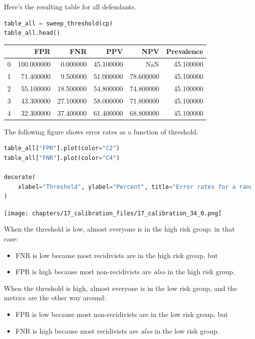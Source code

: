 Here's the resulting table for all defendants.

\begin{lstlisting}[language=Python,style=source]
table_all = sweep_threshold(cp)
table_all.head()
\end{lstlisting}

\begin{tabular}{lrrrrr}
\midrule
 & FPR & FNR & PPV & NPV & Prevalence \\
\midrule
0 & 100.000000 & 0.000000 & 45.100000 & NaN & 45.100000 \\
1 & 71.400000 & 9.500000 & 51.000000 & 78.600000 & 45.100000 \\
2 & 55.100000 & 18.500000 & 54.800000 & 74.800000 & 45.100000 \\
3 & 43.300000 & 27.100000 & 58.000000 & 71.800000 & 45.100000 \\
4 & 32.300000 & 37.400000 & 61.400000 & 68.800000 & 45.100000 \\
\midrule
\end{tabular}

The following figure shows error rates as a function of threshold.

\begin{lstlisting}[language=Python,style=source]
table_all["FPR"].plot(color="C2")
table_all["FNR"].plot(color="C4")

decorate(
    xlabel="Threshold", ylabel="Percent", title="Error rates for a range of thresholds"
)
\end{lstlisting}

\begin{center}
\texttt{[image: chapters/17\_calibration\_files/17\_calibration\_34\_0.png]}
\end{center}

When the threshold is low, almost everyone is in the high risk group; in
that case:

\begin{itemize}
\item
  FNR is low because most recidivists are in the high risk group, but
\item
  FPR is high because most non-recidivists are \emph{also} in the high
  risk group.
\end{itemize}

When the threshold is high, almost everyone is in the low risk group,
and the metrics are the other way around:

\begin{itemize}
\item
  FPR is low because most non-recidivists are in the low risk group, but
\item
  FNR is high because most recidivists are \emph{also} in the low risk
  group.
\end{itemize}

